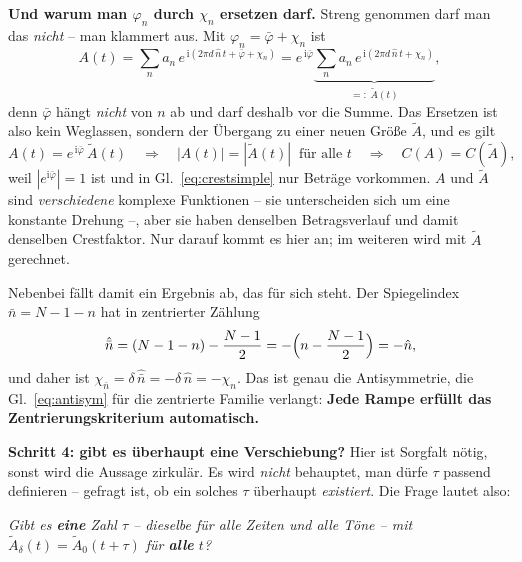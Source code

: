 \documentclass[11pt,a4paper]{article}
\newcommand{\crest}{\ensuremath{C}}
\begin{document}
\medskip
\noindent\textbf{Und warum man $\varphi_n$ durch $\chi_n$ ersetzen darf.}
Streng genommen darf man das \emph{nicht} -- man klammert aus. Mit
$\varphi_n = \bar\varphi + \chi_n$ ist
\begin{equation}
  A(t) = \sum_n a_n\,e^{\,\mathrm{i}(2\pi d\,\hat n\,t + \bar\varphi + \chi_n)}
       = e^{\,\mathrm{i}\bar\varphi}\underbrace{
         \sum_n a_n\,e^{\,\mathrm{i}(2\pi d\,\hat n\,t + \chi_n)}}_{
         =:\;\tilde A(t)} ,
  \label{eq:factorglobal}
\end{equation}
denn $\bar\varphi$ hängt \emph{nicht} von $n$ ab und darf deshalb vor die
Summe. Das Ersetzen ist also kein Weglassen, sondern der Übergang zu einer
neuen Größe $\tilde A$, und es gilt
\begin{equation}
  A(t) = e^{\,\mathrm{i}\bar\varphi}\,\tilde A(t)
  \quad\Longrightarrow\quad
  |A(t)| = |\tilde A(t)| \;\;\text{für alle } t
  \quad\Longrightarrow\quad
  \crest(A) = \crest(\tilde A) ,
\end{equation}
weil $|e^{\mathrm{i}\bar\varphi}| = 1$ ist und in Gl.~\eqref{eq:crestsimple}
nur Beträge vorkommen. $A$ und $\tilde A$ sind \emph{verschiedene} komplexe
Funktionen -- sie unterscheiden sich um eine konstante Drehung --, aber sie
haben denselben Betragsverlauf und damit denselben Crestfaktor. Nur darauf
kommt es hier an; im weiteren wird mit $\tilde A$ gerechnet.

\medskip
\noindent Nebenbei fällt damit ein Ergebnis ab, das für sich steht. Der
Spiegelindex $\bar n = N-1-n$ hat in zentrierter Zählung
\begin{equation}
  \hat{\bar n} = (N-1-n) - \frac{N-1}{2}
               = -\Bigl(n-\frac{N-1}{2}\Bigr) = -\hat n ,
\end{equation}
und daher ist $\chi_{\bar n} = \delta\,\hat{\bar n} = -\delta\,\hat n =
-\chi_n$. Das ist genau die Antisymmetrie, die Gl.~\eqref{eq:antisym} für die
zentrierte Familie verlangt: \textbf{Jede Rampe erfüllt das
Zentrierungskriterium automatisch.}

\medskip
\noindent\textbf{Schritt 4: gibt es überhaupt eine Verschiebung?} Hier ist
Sorgfalt nötig, sonst wird die Aussage zirkulär. Es wird \emph{nicht}
behauptet, man dürfe $\tau$ passend definieren -- gefragt ist, ob ein solches
$\tau$ überhaupt \emph{existiert}. Die Frage lautet also:

\begin{center}
\emph{Gibt es \textbf{eine} Zahl $\tau$ -- dieselbe für alle Zeiten und alle
Töne -- mit $\tilde A_\delta(t) = \tilde A_0(t+\tau)$ für \textbf{alle} $t$?}
\end{center}
\end{document}
